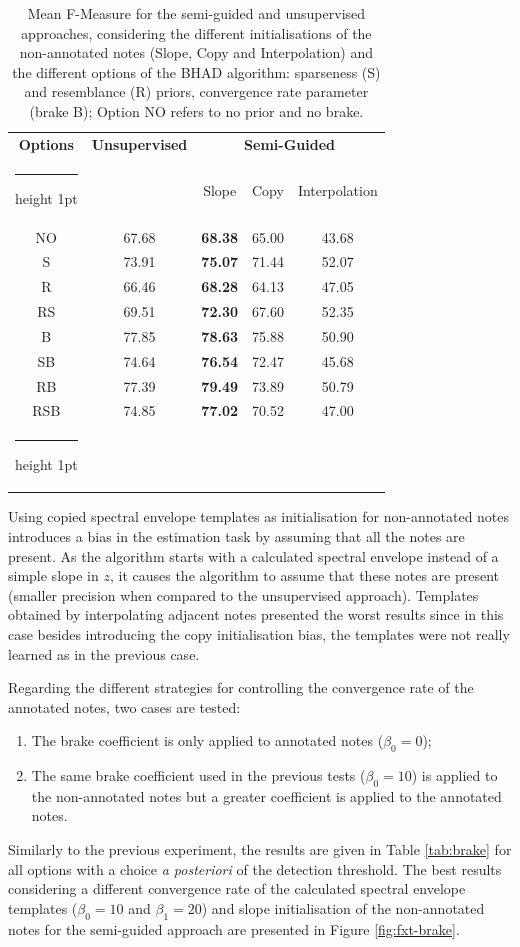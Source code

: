 \documentclass{article}
\makeatletter
\newcommand{\thickhline}{%
    \noalign {\ifnum 0=`}\fi \hrule height 1pt
    \futurelet \reserved@a \@xhline
}
\makeatother
\begin{document}
\begin{table}[htb]
\centering
\begin{tabular}{ccccc}
\hline
\textbf{Options} & \textbf{Unsupervised} & \multicolumn{3}{c}{\textbf{Semi-Guided}} \\\thickhline
 & & Slope & Copy & Interpolation \\\hline
 NO  & 67.68 &	 \textbf{68.38} &	 65.00 &	 43.68 \\
 S   & 73.91 &     \textbf{75.07} &	 71.44 &	 52.07 \\
 R   & 66.46 &	 \textbf{68.28} &	 64.13 &	 47.05 \\
 RS  & 69.51 &	 \textbf{72.30} &	 67.60 &	 52.35 \\ \hline
 B   & 77.85 &	 \textbf{78.63} &	 75.88 &	 50.90 \\
 SB  & 74.64 &	 \textbf{76.54} &	 72.47 &	 45.68 \\
 RB  & 77.39 &	 \textbf{79.49} &	 73.89 &	 50.79 \\
 RSB & 74.85 &	 \textbf{77.02} &	 70.52 & 	 47.00  \\\thickhline
\end{tabular}
\caption{Mean F-Measure for the semi-guided and unsupervised approaches, considering the different initialisations of the non-annotated notes (Slope, Copy and Interpolation) and the different options of the BHAD algorithm: sparseness (S) and resemblance (R) priors, convergence rate parameter (brake B); Option NO refers to no prior and no brake.}
\label{tab:init}
\end{table}




Using copied spectral envelope templates as initialisation for non-annotated notes introduces a bias in the estimation task by assuming that all the notes are present. As the algorithm starts with a calculated spectral envelope instead of a simple slope in $z$, it causes the algorithm to assume that these notes are present (smaller precision when compared to the unsupervised approach). Templates obtained by interpolating adjacent notes presented the worst results since in this case besides introducing the copy initialisation bias, the templates were not really learned as in the previous case.

Regarding the different strategies for controlling the convergence rate of the annotated notes, two cases are tested:

\begin{enumerate}
\item The brake coefficient is only applied to annotated notes ($\beta_0=0$);
\item The same brake coefficient used in the previous tests ($\beta_0=10$) is applied to the non-annotated notes but a greater coefficient is applied to the annotated notes.
\end{enumerate}
Similarly to the previous experiment, the results are given in Table \ref{tab:brake} for all options with a choice \textit{a posteriori} of the detection threshold. The best results considering a different convergence rate of the calculated spectral envelope templates ($\beta_0=10$ and $\beta_1=20$) and  slope initialisation of the non-annotated notes for the semi-guided approach are presented in Figure \ref{fig:fxt-brake}.
\end{document}
